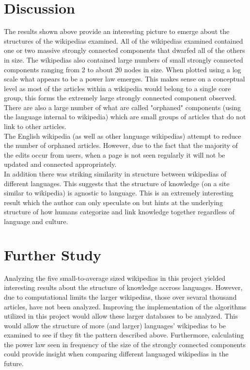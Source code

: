 \documentclass[twoside]{article}
\begin{document}
\begin{multicols}{2} %

\section{Discussion}

The results shown above provide an interesting picture to emerge about the structures of the 
wikipedias examined. All of the wikipedias examined contained one or two massive strongly connected
components that dwarfed all of the others in size. The wikipedias also contained large numbers of 
small strongly connected components ranging from 2 to about 20 nodes in size. When
plotted using a log scale what appears to be a power law emerges. This makes sense on a 
conceptual level as most of the articles within a wikipedia would belong to a single core group, this forms the extremely
large strongly connected component observed. There are also a large number of what are called "orphaned"
components (using the language internal to wikipedia) which are small groups of articles that do not link to 
other articles. \\

The English wikipedia (as well as other language wikipedias) attempt to reduce the number of orphaned 
articles. However, due to the fact that the majority of the edits occur from users, when a page is not seen regularly
it will not be updated and connected appropriately.\\

In addition there was striking similarity in structure between wikipedias
of different languages. This suggests that the structure of knowledge (on a site similar
to wikipedia) is agnostic to language. This is an extremely interesting result which the author can only
speculate on but hints at the underlying structure of how humans categorize and link knowledge together regardless
of language and culture.


\section{Further Study}

Analyzing the five small-to-average sized wikipedias in this project yielded interesting results
about the structure of knowledge accross languages. However, due to computational limits the larger wikipedias, 
those over sevaral thousand articles,
have not been analyzed. Improving the implementation of the algorithms utilized in this project
would allow these larger databases to be analyzed. This would allow the structure of more (and larger)
languages' wikipedias to be examined to see if they fit the pattern described above. Furthermore, 
calculating the power law seen in frequency of the size of the strongly connected components could
provide insight when comparing different languaged wikipedias in the future.\\


\end{multicols}
\end{document}
